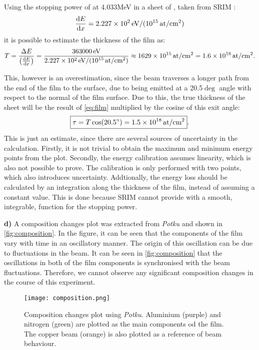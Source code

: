 Using the stopping power of  at 4.033\unit{MeV} in a sheet of , taken from SRIM \cite{srim}: $$\frac{\text{d} E}{\text{d} x} = 2.227\times 10^{2}\,\text{eV/(10$^{15}$\,at/cm$^2$)}$$ it is possible to estimate the thickness of the film as:
\begin{equation}
    \label{eq:film}
    T = \frac{\Delta E}{\left(\frac{\text{d} E}{\text{d} x}\right)} = \frac{363000\,\text{eV}}{2.227\times 10^{2}\,\text{eV/(10$^{15}$\,at/cm$^2$)}} \approx 1629\times 10^{15}\,\text{at/cm$^2$} = 1.6\times 10^{18}\,\text{at/cm$^2$}.
\end{equation}

This, however is an overestimation, since the beam traverses a longer path from the end of the film to the surface, due to being emitted at a 20.5$\deg$ angle with respect to the normal of the film surface. Due to this, the true thickness of the sheet will be the result of \autoref{eq:film} multiplied by the cosine of this exit angle:
\begin{equation}
    \label{eq:filmcos}
    \boxed{\tau = T\cos(20.5^{\circ}) = 1.5\times 10^{18}\,\text{at/cm$^2$}}.
\end{equation}
This is just an estimate, since there are several sources of uncertainty in the calculation. Firstly, it is not trivial to obtain the maximum and minimum energy points from the plot. Secondly, the energy calibration assumes linearity, which is also not possible to prove. The calibration is only performed with two points, which also introduces uncertainty. Addtionally, the energy loss should be calculated by an integration along the thickness of the film, instead of assuming a constant value. This is done because SRIM cannot provide with a smooth, integrable, function for the stopping power. 

\textbf{d)} A composition changes plot was extracted from \textit{Potku} and shown in \autoref{fig:composition}. In the figure, it can be seen that the components of the film vary with time in an oscillatory manner. The origin of this oscillation can be due to fluctuations in the beam. It can be seen in \autoref{fig:composition} that the oscillations in both of the film components is synchronised with the beam fluctuations. Therefore, we cannot observe any significant composition changes in the course of this experiment.

\begin{figure}[t]
    \centering
    \texttt{[image: composition.png]}
    \caption{Composition changes plot using \textit{Potku}. Aluminium (purple) and nitrogen (green) are plotted as the main components od the film. The copper beam (orange) is also plotted as a reference of beam behaviour.}
    \label{fig:composition}
\end{figure}
\newpage


